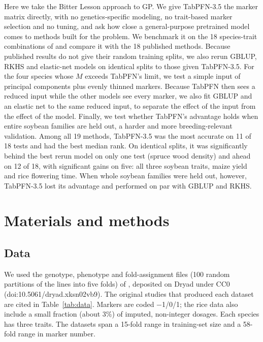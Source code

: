 \documentclass[11pt]{article}
\begin{document}
Here we take the Bitter Lesson approach to GP. We give TabPFN-3.5 the marker matrix directly, with no genetics-specific modeling, no trait-based marker selection and no tuning, and ask how close a general-purpose pretrained model comes to methods built for the problem. We benchmark it on the 18 species-trait combinations of \citet{azodi2019} and compare it with the 18 published methods. Because published results do not give their random training splits, we also rerun GBLUP, RKHS and elastic-net models on identical splits to those given TabPFN-3.5. For the four species whose $M$ exceeds TabPFN's limit, we test a simple input of principal components plus evenly thinned markers. Because TabPFN then sees a reduced input while the other models see every marker, we also fit GBLUP and an elastic net to the same reduced input, to separate the effect of the input from the effect of the model. Finally, we test whether TabPFN's advantage holds when entire soybean families are held out, a harder and more breeding-relevant validation. Among all 19 methods, TabPFN-3.5 was the most accurate on 11 of 18 tests and had the best median rank. On identical splits, it was significantly behind the best rerun model on only one test (spruce wood density) and ahead on 12 of 18, with significant gains on five: all three soybean traits, maize yield and rice flowering time. When whole soybean families were held out, however, TabPFN-3.5 lost its advantage and performed on par with GBLUP and RKHS.

\section{Materials and methods}

\subsection{Data}

We used the genotype, phenotype and fold-assignment files (100 random partitions of the lines into five folds) of \citet{azodi2019}, deposited on Dryad under CC0 (doi:10.5061/dryad.xksn02vb9). The original studies that produced each dataset are cited in Table~\ref{tab:data}. Markers are coded −1/0/1; the rice data also include a small fraction (about 3\%) of imputed, non-integer dosages. Each species has three traits. The datasets span a 15-fold range in training-set size and a 58-fold range in marker number.
\end{document}
